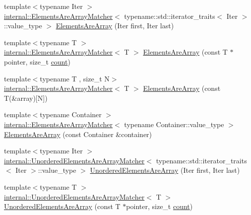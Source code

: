 \begin{DoxyCompactItemize}
\item 
{\footnotesize template$<$typename Iter $>$ }\\\hyperlink{classtesting_1_1internal_1_1_elements_are_array_matcher}{internal\+::\+Elements\+Are\+Array\+Matcher}$<$ typename\+::std\+::iterator\+\_\+traits$<$ Iter $>$\+::value\+\_\+type $>$ \hyperlink{namespacetesting_ae2eee06e7ddbf5f5372fd24372e9703f}{Elements\+Are\+Array} (Iter first, Iter last)
\item 
{\footnotesize template$<$typename T $>$ }\\\hyperlink{classtesting_1_1internal_1_1_elements_are_array_matcher}{internal\+::\+Elements\+Are\+Array\+Matcher}$<$ T $>$ \hyperlink{namespacetesting_abf5c2219b4e6a7542368b5f68eadd007}{Elements\+Are\+Array} (const T $\ast$pointer, size\+\_\+t \hyperlink{gmock__stress__test_8cc_afd9db40e3361ae09188795e8cbe19752}{count})
\item 
{\footnotesize template$<$typename T , size\+\_\+t N$>$ }\\\hyperlink{classtesting_1_1internal_1_1_elements_are_array_matcher}{internal\+::\+Elements\+Are\+Array\+Matcher}$<$ T $>$ \hyperlink{namespacetesting_ac5895c9867d6b976351446a043dcdd66}{Elements\+Are\+Array} (const T(\&array)\mbox{[}N\mbox{]})
\item 
{\footnotesize template$<$typename Container $>$ }\\\hyperlink{classtesting_1_1internal_1_1_elements_are_array_matcher}{internal\+::\+Elements\+Are\+Array\+Matcher}$<$ typename Container\+::value\+\_\+type $>$ \hyperlink{namespacetesting_ad257747adbe056feaa92f449063d681f}{Elements\+Are\+Array} (const Container \&container)
\item 
{\footnotesize template$<$typename Iter $>$ }\\\hyperlink{classtesting_1_1internal_1_1_unordered_elements_are_array_matcher}{internal\+::\+Unordered\+Elements\+Are\+Array\+Matcher}$<$ typename\+::std\+::iterator\+\_\+traits$<$ Iter $>$\+::value\+\_\+type $>$ \hyperlink{namespacetesting_ab4896081406209171a1596b7028e1cf7}{Unordered\+Elements\+Are\+Array} (Iter first, Iter last)
\item 
{\footnotesize template$<$typename T $>$ }\\\hyperlink{classtesting_1_1internal_1_1_unordered_elements_are_array_matcher}{internal\+::\+Unordered\+Elements\+Are\+Array\+Matcher}$<$ T $>$ \hyperlink{namespacetesting_a99b9509a7cd405be28bf45231577384b}{Unordered\+Elements\+Are\+Array} (const T $\ast$pointer, size\+\_\+t \hyperlink{gmock__stress__test_8cc_afd9db40e3361ae09188795e8cbe19752}{count})

\end{DoxyCompactItemize}
